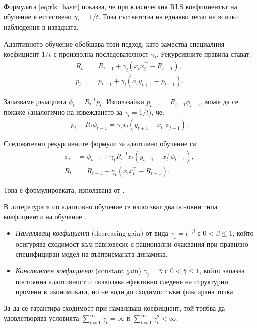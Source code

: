 Формулата \eqref{eq:rls_basic} показва, че при класическия RLS коефициентът на обучение е естествено $\gamma_t = 1/t$. Това съответства на еднакво тегло на всички наблюдения в извадката.

Адаптивното обучение обобщава този подход, като замества специалния коефициент $1/t$ с произволна последователност $\gamma_t$. Рекурсивните правила стават:
\begin{align}
R_t &= R_{t-1} + \gamma_t(x_t x_t^\top - R_{t-1}), \label{eq:R_general}\\
p_t &= p_{t-1} + \gamma_t(x_t y_{t+1} - p_{t-1}). \label{eq:p_general}
\end{align}

Запазваме релацията $\phi_t = R_t^{-1} p_t$. Използвайки $p_{t-1} = R_{t-1}\phi_{t-1}$, може да се покаже (аналогично на извеждането за $\gamma_t = 1/t$), че:
\begin{equation}
p_t - R_t\phi_{t-1} = \gamma_t x_t(y_{t+1} - x_t^\top\phi_{t-1}).
\end{equation}

Следователно рекурсивните формули за адаптивно обучение са:
\begin{align}
\phi_t &= \phi_{t-1} + \gamma_t R_t^{-1} x_t (y_{t+1} - x_t^\top \phi_{t-1}),
\label{eq:RLS_phi} \\
R_t &= R_{t-1} + \gamma_t (x_t x_t^\top - R_{t-1}).
\label{eq:RLS_R}
\end{align}

Това е формулировката, използвана от \textcite[стр. 33-34]{GeorgeEvans_2001}.

В литературата по адаптивно обучение се използват два основни типа коефициенти на обучение \parencite[раздел 15.2]{GeorgeEvans_2001}.

\begin{itemize}
\item \emph{Намаляващ коефициент} (decreasing gain) от вида $\gamma_t = t^{-\beta}$ с $0 < \beta \leq 1$, който осигурява сходимост към равновесие с рационални очаквания при правилно специфициран модел на възприеманата динамика.

\item \emph{Константен коефициент} (constant gain) $\gamma_t = \bar{\gamma}$ с $0 < \bar{\gamma} \leq 1$, който запазва постоянна адаптивност и позволява ефективно следене на структурни промени в икономиката, но не води до сходимост към фиксирана точка.
\end{itemize}

За да се гарантира сходимост при намаляващ коефициент, той трябва да удовлетворява условията $\sum_{t=1}^{\infty} \gamma_t = \infty$ и $\sum_{t=1}^{\infty} \gamma_t^2 < \infty$. 

